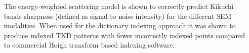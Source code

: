 The energy-weighted scattering model is shown to correctly predict Kikuchi bands sharpness (defined as signal to noise intensity) for the different SEM modalities. When used for the dictionary indexing approach it was shown to produce indexed TKD patterns with fewer incorrectly indexed points compared to commercial Hoigh transform based indexing software. 
